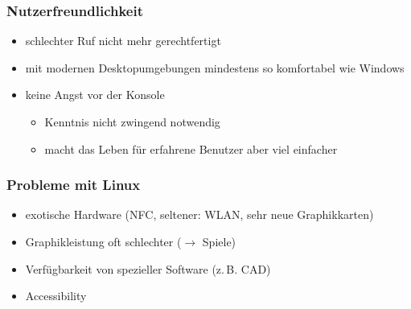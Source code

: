 \documentclass[t]{beamer}
\begin{document}
\begin{frame}
  \frametitle{Nutzerfreundlichkeit}
  \begin{itemize}
  \item schlechter Ruf nicht mehr gerechtfertigt
  \item mit modernen Desktopumgebungen mindestens so komfortabel wie
    Windows
  \item keine Angst vor der Konsole
    \begin{itemize}
    \item Kenntnis nicht zwingend notwendig
    \item macht das Leben für erfahrene Benutzer aber viel einfacher
    \end{itemize}
  \end{itemize}
\end{frame}

\begin{frame}
  \frametitle{Probleme mit Linux}
  \begin{itemize}
  \item exotische Hardware (NFC, seltener: WLAN, sehr neue Graphikkarten)
  \item Graphikleistung oft schlechter ($\rightarrow$ Spiele)
  \item Verfügbarkeit von spezieller Software (z.\,B. CAD)
  \item Accessibility
  \end{itemize}
\end{frame}
\end{document}

